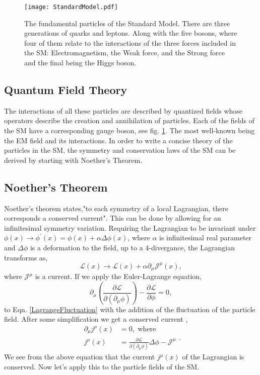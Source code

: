 \begin{figure}
 	\centering
	\texttt{[image: StandardModel.pdf]}
 	\caption[Standard Model particles]{The fundamental particles of the Standard Model. There are three generations of quarks and leptons. Along with the five bosons, where four of them relate to the interactions of the three forces included in the SM: Electromagnetism, the Weak force, and the Strong force and the final being the Higgs boson.}
 	\label{SMParticles} 
\end{figure}
 
 \subsection{Quantum Field Theory}
 \label{QFT}
 
 The interactions of all these particles are described by quantized fields whose operators describe the creation and annihilation of particles. Each of the fields of the SM have a corresponding gauge boson, see fig. \ref{SMParticles}. The most well-known being the EM field and its interactions. In order to write a concise theory of the particles in the SM, the symmetry and conservation laws of the SM can be derived by starting with Noether's Theorem.
 
 \subsection{Noether's Theorem}
 
 Noether's theorem states,"to each symmetry of a local Lagrangian, there corresponds a conserved current". This can be done by allowing for an infinitesimal symmetry variation. Requiring the Lagrangian to be invariant under $\phi(x)\rightarrow\phi^\prime(x)=\phi(x)+\alpha\Delta\phi(x)$, where $\alpha$ is infinitesimal real parameter and $\Delta\phi$ is a deformation to the field, up to a 4-divergance, the Lagrangian transforms as,
 \begin{equation}\label{LagrangeFluctuation}
 \mathcal{L}(x)\rightarrow\mathcal{L}(x)+\alpha\partial_\mu\mathcal{J}^\mu(x),
 \end{equation}
 where $\mathcal{J}^\mu$ is a current. If we apply the Euler-Lagrange equation,
 \begin{equation}
 \partial_\mu(\frac{\partial\mathcal{L}}{\partial(\partial_\mu\phi)})-\frac{\partial\mathcal{L}}{\partial\phi}=0,
 \end{equation}
 to Eqn. \ref{LagrangeFluctuation} with the addition of the fluctuation of the particle field. After some simplification we get a conserved current \cite{halzen_quarks_1984, peskin_introduction_1995},
 \begin{equation}
 \begin{split}
 \partial_\mu j^\mu(x)&=0, \text{ where}\\
 j^\mu(x)&=\frac{\partial\mathcal{L}}{\partial(\partial_\mu\phi)}\Delta\phi-\mathcal{J}^\mu
 \end{split}.
 \end{equation} We see from the above equation that the current $j^\mu(x)$ of the Lagrangian is conserved. Now let's apply this to the particle fields of the SM.
 
